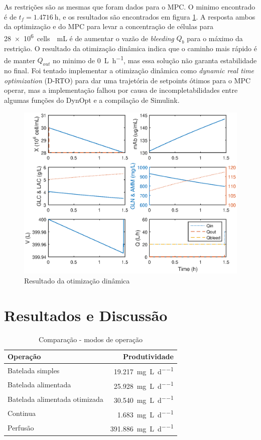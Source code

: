 \documentclass[fleqn,10pt]{SelfArx} %
\begin{document}
As restrições são as mesmas que foram dados para o MPC. O minimo encontrado é de $t_{f} = \SI{1.4716}{\hour}$, e os resultados são encontrados em figura \ref{fig:model4tmin}. A resposta ambos da optimização e do MPC para levar a concentração de células para \SI{28e6}{cells \per\mL} é de aumentar o vazão de \textit{bleeding} $Q_b$ para o máximo da restrição. O resultado da otimização dinâmica indica que o caminho mais rápido é de manter $Q_{out}$ no minimo de \SI{0}{ \L\per\hour}, mas essa solução não garanta estabilidade no final. Foi tentado implementar a otimização dinâmica como \textit{dynamic real time optimization} (D-RTO) para dar uma trajetória de setpoints ótimos para o MPC operar, mas a implementação falhou por causa de incompletabilidades entre algumas funções do DynOpt e a compilação de Simulink.

\begin{figure}[ht]\centering
	\includegraphics[width=\linewidth]{model4_tmin3}
	\caption{Resultado da otimização dinâmica}
	\label{fig:model4tmin}
\end{figure}

\section{Resultados e Discussão}

\begin{table}
	\caption{Comparação - modos de operação}
	\centering
	\begin{tabular}{lr}
		\toprule
		Operação & Produtividade\\
		\midrule	
		Batelada simples & \SI{19.217}{ \mg\per\L\per\day}\\
		Batelada alimentada & \SI{25.928}{ \mg\per\L\per\day}\\
		Batelada alimentada otimizada & \SI{30.540}{ \mg\per\L\per\day}\\
		Continua & \SI{1.683}{ \mg\per\L\per\day}\\
		Perfusão & \SI{391.886}{ \mg\per\L\per\day}
	\end{tabular}
	\label{tab:results}
\end{table}
\end{document}
